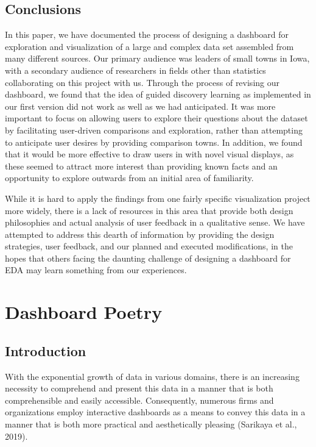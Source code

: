 \documentclass[print]{nuthesis}
\begin{document}
\hypertarget{conclusions}{%
\section{Conclusions}\label{conclusions}}

In this paper, we have documented the process of designing a dashboard for exploration and visualization of a large and complex data set assembled from many different sources. Our primary audience was leaders of small towns in Iowa, with a secondary audience of researchers in fields other than statistics collaborating on this project with us. Through the process of revising our dashboard, we found that the idea of guided discovery learning as implemented in our first version did not work as well as we had anticipated. It was more important to focus on allowing users to explore their questions about the dataset by facilitating user-driven comparisons and exploration, rather than attempting to anticipate user desires by providing comparison towns. In addition, we found that it would be more effective to draw users in with novel visual displays, as these seemed to attract more interest than providing known facts and an opportunity to explore outwards from an initial area of familiarity.

While it is hard to apply the findings from one fairly specific visualization project more widely, there is a lack of resources in this area that provide both design philosophies and actual analysis of user feedback in a qualitative sense. We have attempted to address this dearth of information by providing the design strategies, user feedback, and our planned and executed modifications, in the hopes that others facing the daunting challenge of designing a dashboard for EDA may learn something from our experiences.

\hypertarget{math-sci}{%
\chapter{Dashboard Poetry}\label{math-sci}}

\hypertarget{introduction-2}{%
\section{Introduction}\label{introduction-2}}

With the exponential growth of data in various domains, there is an increasing necessity to comprehend and present this data in a manner that is both comprehensible and easily accessible.
Consequently, numerous firms and organizations employ interactive dashboards as a means to convey this data in a manner that is both more practical and aesthetically pleasing (Sarikaya et al., 2019).
\end{document}
